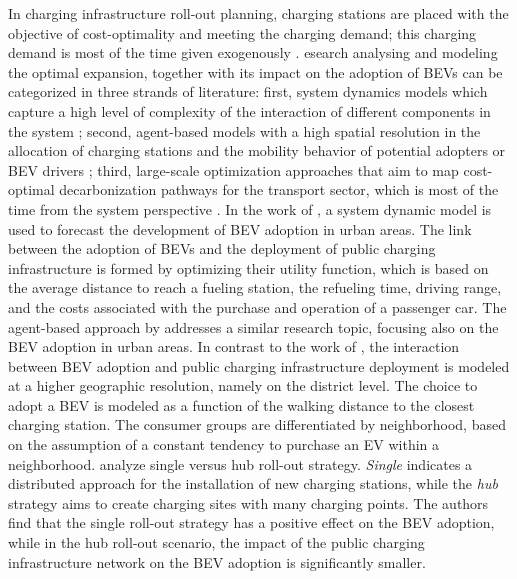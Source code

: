 \documentclass[preprint,review,11pt, authoryear]{elsarticle}
\begin{document}
    In charging infrastructure roll-out planning, charging stations are placed with the objective of cost-optimality and meeting the charging demand; this charging demand is most of the time given exogenously \citep{METAIS2022111719}. esearch analysing and modeling the optimal expansion, together with its impact on the adoption of BEVs can be categorized in three strands of literature: first, system dynamics models which capture a high level of complexity of the interaction of different components in the system \citep{9706486, GAO2024103969}; second, agent-based models with a high spatial resolution in the allocation of charging stations and the mobility behavior of potential adopters or BEV drivers \citep{LIAO2023103645, WOLBERTUS2021262}; third, large-scale optimization approaches that aim to map cost-optimal decarbonization pathways for the transport sector, which is most of the time from the system perspective \citep{TATTINI2018265}. In the work of \citet{GAO2024103969}, a system dynamic model is used to forecast the development of BEV adoption in urban areas. The link between the adoption of BEVs and the deployment of public charging infrastructure is formed by optimizing their utility function, which is based on the average distance to reach a fueling station, the refueling time, driving range, and the costs associated with the purchase and operation of a passenger car. The agent-based approach by \citet{WOLBERTUS2021262} addresses a similar research topic, focusing also on the BEV adoption in urban areas. In contrast to the work of \citet{GAO2024103969}, the interaction between BEV adoption and public charging infrastructure deployment is modeled at a higher geographic resolution, namely on the district level. The choice to adopt a BEV is modeled as a function of the walking distance to the closest charging station. The consumer groups are differentiated by neighborhood, based on the assumption of a constant tendency to purchase an EV within a neighborhood. \citet{WOLBERTUS2021262} analyze single versus hub roll-out strategy. \textit{Single} indicates a distributed approach for the installation of new charging stations, while the \textit{hub} strategy aims to create charging sites with many charging points. The authors find that the single roll-out strategy has a positive effect on the BEV adoption, while in the hub roll-out scenario, the impact of the public charging infrastructure network on the BEV adoption is significantly smaller. 
\end{document}
